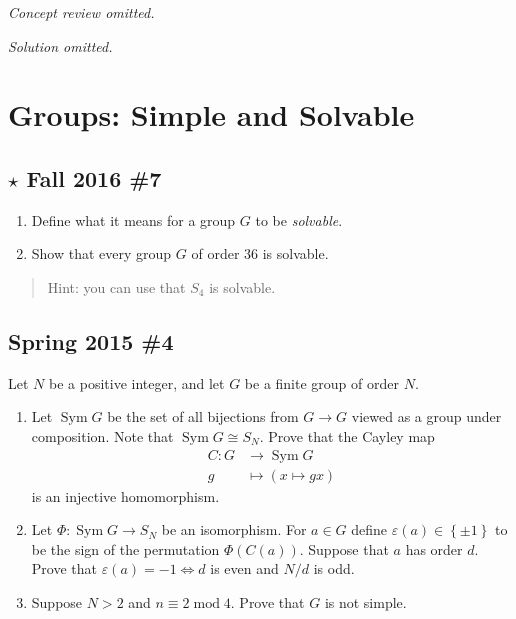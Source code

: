 \emph{Concept review omitted.}

\emph{Solution omitted.}

\hypertarget{groups-simple-and-solvable}{%
\section{Groups: Simple and Solvable}\label{groups-simple-and-solvable}}

\hypertarget{star-fall-2016-7}{%
\subsection{\texorpdfstring{\(\star\) Fall 2016
\#7}{\textbackslash star Fall 2016 \#7}}\label{star-fall-2016-7}}

\begin{enumerate}
\def\labelenumi{\alph{enumi}.}
\item
  Define what it means for a group \(G\) to be \emph{solvable}.
\item
  Show that every group \(G\) of order 36 is solvable.
\end{enumerate}

\begin{quote}
Hint: you can use that \(S_4\) is solvable.
\end{quote}

\hypertarget{spring-2015-4}{%
\subsection{Spring 2015 \#4}\label{spring-2015-4}}

Let \(N\) be a positive integer, and let \(G\) be a finite group of
order \(N\).

\begin{enumerate}
\def\labelenumi{\alph{enumi}.}
\item
  Let \(\operatorname{Sym}G\) be the set of all bijections from
  \(G\to G\) viewed as a group under composition. Note that
  \(\operatorname{Sym}G \cong S_N\). Prove that the Cayley map
  \begin{align*}
  C: G&\to \operatorname{Sym}G\\
  g &\mapsto (x\mapsto gx)
  \end{align*}
  is an injective homomorphism.
\item
  Let \(\Phi: \operatorname{Sym}G\to S_N\) be an isomorphism. For
  \(a\in G\) define \({\varepsilon}(a) \in \left\{{\pm 1}\right\}\) to
  be the sign of the permutation \(\Phi(C(a))\). Suppose that \(a\) has
  order \(d\). Prove that \({\varepsilon}(a) = -1 \iff d\) is even and
  \(N/d\) is odd.
\item
  Suppose \(N> 2\) and \(n\equiv 2 \operatorname{mod}4\). Prove that
  \(G\) is not simple.
\end{enumerate}


